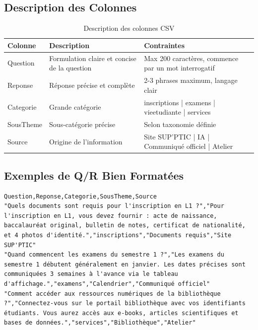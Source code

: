 \documentclass[11pt,a4paper]{article}
\begin{document}
\subsection{Description des Colonnes}
\begin{table}[H]
    \centering
    \begin{tabularx}{\textwidth}{|l|X|X|}
        \hline
        \textbf{Colonne} & \textbf{Description} & \textbf{Contraintes} \\
        \hline
        Question & Formulation claire et concise de la question & Max 200 caractères, commence par un mot interrogatif \\
        \hline
        Reponse & Réponse précise et complète & 2-3 phrases maximum, langage clair \\
        \hline
        Categorie & Grande catégorie & inscriptions | examens | vieetudiante | services \\
        \hline
        SousTheme & Sous-catégorie précise & Selon taxonomie définie \\
        \hline
        Source & Origine de l'information & Site SUP'PTIC | IA | Communiqué officiel | Atelier \\
        \hline
    \end{tabularx}
    \caption{Description des colonnes CSV}
\end{table}

\subsection{Exemples de Q/R Bien Formatées}
\begin{lstlisting}[caption=Exemple de fichier CSV valide]
Question,Reponse,Categorie,SousTheme,Source
"Quels documents sont requis pour l'inscription en L1 ?","Pour l'inscription en L1, vous devez fournir : acte de naissance, baccalauréat original, bulletin de notes, certificat de nationalité, et 4 photos d'identité.","inscriptions","Documents requis","Site SUP'PTIC"
"Quand commencent les examens du semestre 1 ?","Les examens du semestre 1 débutent généralement en janvier. Les dates précises sont communiquées 3 semaines à l'avance via le tableau d'affichage.","examens","Calendrier","Communiqué officiel"
"Comment accéder aux ressources numériques de la bibliothèque ?","Connectez-vous sur le portail bibliothèque avec vos identifiants étudiants. Vous aurez accès aux e-books, articles scientifiques et bases de données.","services","Bibliothèque","Atelier"
\end{lstlisting}
\end{document}
